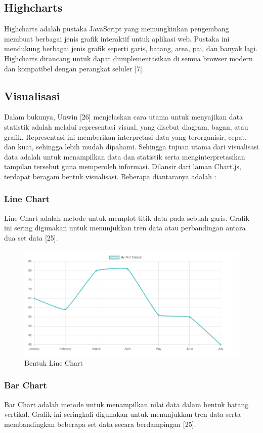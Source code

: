 \subsection{Highcharts}
Highcharts adalah pustaka JavaScript yang memungkinkan pengembang membuat berbagai jenis grafik interaktif untuk aplikasi web. Pustaka ini mendukung berbagai jenis grafik seperti garis, batang, area, pai, dan banyak lagi. Highcharts dirancang untuk dapat diimplementasikan di semua browser modern dan kompatibel dengan perangkat seluler [7].

\subsection{Visualisasi}
Dalam bukunya, Unwin [26] menjelaskan cara utama untuk menyajikan data statistik adalah melalui representasi visual, yang disebut diagram, bagan, atau grafik. Representasi ini memberikan interpretasi data yang terorganisir, cepat, dan kuat, sehingga lebih mudah dipahami. Sehingga tujuan utama dari visualisasi data adalah untuk menampilkan data dan statistik serta menginterpretasikan tampilan tersebut guna memperoleh informasi. Dilansir dari laman Chart.js, terdapat beragam bentuk visualisasi. Beberapa diantaranya adalah : 

\subsubsection{Line Chart}
Line Chart adalah metode untuk memplot titik data pada sebuah garis. Grafik ini sering digunakan untuk menunjukkan tren data atau perbandingan antara dua set data [25].

\begin{figure}[H]
	\centering
	\includegraphics[width=0.8\linewidth]{gambar/Dasar teori/LineChart.png}
	\caption{Bentuk Line Chart}
	\label{gambar1}
\end{figure}

\subsubsection{Bar Chart}
Bar Chart adalah metode untuk menampilkan nilai data dalam bentuk batang vertikal. Grafik ini seringkali digunakan untuk menunjukkan tren data serta membandingkan beberapa set data secara berdampingan [25].

